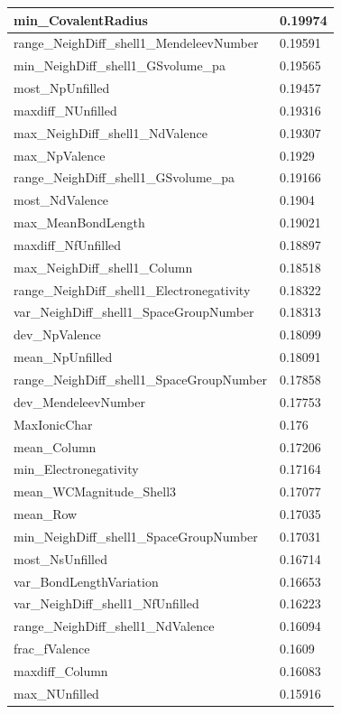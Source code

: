 \begin{longtable}{|l|l|}
min\_CovalentRadius & 0.19974 \\ \hline
range\_NeighDiff\_shell1\_MendeleevNumber & 0.19591 \\ \hline
min\_NeighDiff\_shell1\_GSvolume\_pa & 0.19565 \\ \hline
most\_NpUnfilled & 0.19457 \\ \hline
maxdiff\_NUnfilled & 0.19316 \\ \hline
max\_NeighDiff\_shell1\_NdValence & 0.19307 \\ \hline
max\_NpValence & 0.1929 \\ \hline
range\_NeighDiff\_shell1\_GSvolume\_pa & 0.19166 \\ \hline
most\_NdValence & 0.1904 \\ \hline
max\_MeanBondLength & 0.19021 \\ \hline
maxdiff\_NfUnfilled & 0.18897 \\ \hline
max\_NeighDiff\_shell1\_Column & 0.18518 \\ \hline
range\_NeighDiff\_shell1\_Electronegativity & 0.18322 \\ \hline
var\_NeighDiff\_shell1\_SpaceGroupNumber & 0.18313 \\ \hline
dev\_NpValence & 0.18099 \\ \hline
mean\_NpUnfilled & 0.18091 \\ \hline
range\_NeighDiff\_shell1\_SpaceGroupNumber & 0.17858 \\ \hline
dev\_MendeleevNumber & 0.17753 \\ \hline
MaxIonicChar & 0.176 \\ \hline
mean\_Column & 0.17206 \\ \hline
min\_Electronegativity & 0.17164 \\ \hline
mean\_WCMagnitude\_Shell3 & 0.17077 \\ \hline
mean\_Row & 0.17035 \\ \hline
min\_NeighDiff\_shell1\_SpaceGroupNumber & 0.17031 \\ \hline
most\_NsUnfilled & 0.16714 \\ \hline
var\_BondLengthVariation & 0.16653 \\ \hline
var\_NeighDiff\_shell1\_NfUnfilled & 0.16223 \\ \hline
range\_NeighDiff\_shell1\_NdValence & 0.16094 \\ \hline
frac\_fValence & 0.1609 \\ \hline
maxdiff\_Column & 0.16083 \\ \hline
max\_NUnfilled & 0.15916 \\ \hline

\end{longtable}
